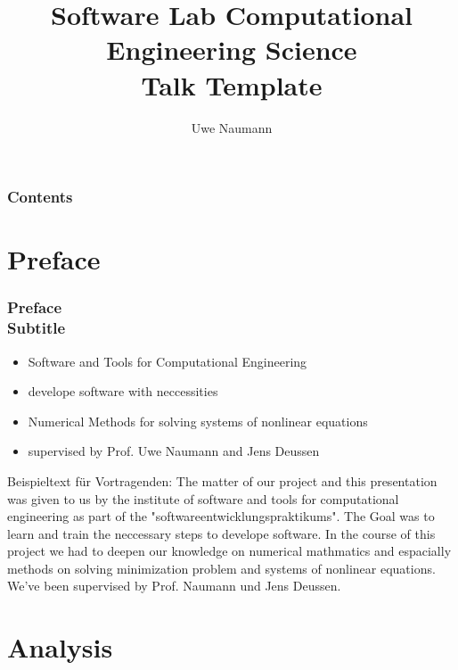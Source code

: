 \documentclass[ucs,10pt]{beamer}
\begin{document}
\title[{\tt info@stce.rwth-aachen.de}]{\textcolor{rwth-blue}{Software Lab Computational Engineering Science} \vspace{.2cm} \\ {\small Talk Template}}
\author[Talk (Template)]{Uwe Naumann} 
\date[]{}

\begin{frame}[plain]
\titlepage
\end{frame}

\begin{frame}
	\frametitle{Contents}
\tableofcontents
\end{frame}

\section{Preface}

\begin{frame}
\frametitle{Preface \\
	\small \color{rwth-blue} Subtitle}
	\begin{itemize}
	\item Software and Tools for Computational Engineering 
	\item develope software with neccessities
	\item Numerical Methods for solving systems of nonlinear equations
	\item supervised by Prof. Uwe Naumann and Jens Deussen
	\end{itemize}
	Beispieltext für Vortragenden:
	The matter of our project and this presentation was given to us by the institute of software and tools for computational engineering as part of the "softwareentwicklungspraktikums". The Goal was to learn and train the neccessary steps to develope software. In the course of this project we had to deepen our knowledge on numerical mathmatics and espacially methods on solving minimization problem and systems of nonlinear equations.
	We've been supervised by Prof. Naumann und Jens Deussen. 
	
\end{frame}

\section{Analysis}
\end{document}
